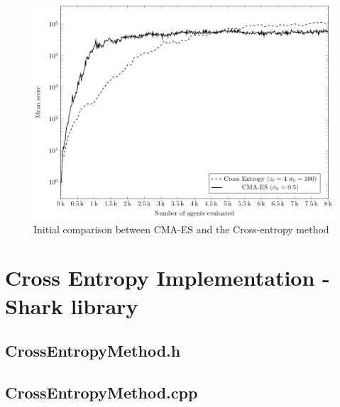 \begin{figure}[H]
\begin{center}
\includegraphics[scale=0.8]{plots/cmaCePlot}
\end{center}
\caption{Initial comparison between CMA-ES and the Cross-entropy method \label{fig:appendixCMA_VS_CE_00}}
\end{figure}

\clearpage


%

%



\section{Cross Entropy Implementation - Shark library \label{app:crossEntropyCode}}

\subsection{CrossEntropyMethod.h}



\clearpage

\subsection{CrossEntropyMethod.cpp}


